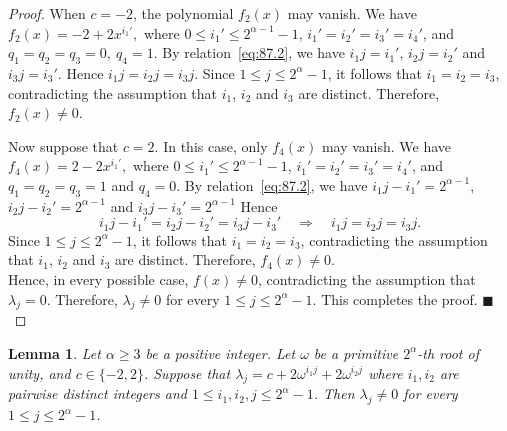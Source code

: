 \documentclass[12pt]{article}
\newtheorem{lemA}[propA]{Lemma}
\begin{document}
\begin{proof}
When $c=-2$, the polynomial $f_2(x)$ may vanish. We have
$
f_2(x)=-2+2x^{i_1'},
$
where $0\le i_1'\le 2^{\alpha-1}-1$, $i_1'=i_2'=i_3'=i_4'$, and $q_1=q_2=q_3=0,\ q_4=1$. By relation~\eqref{eq:87.2}, we have
$
i_1j=i_1'$, $i_2j=i_2'$ and $i_3j=i_3'$.
Hence $i_1j=i_2j=i_3j$.
Since $1\le j\le2^\alpha-1$, it follows that $i_1=i_2=i_3$, contradicting the assumption that $i_1$, $i_2$ and $i_3$ are distinct. Therefore, $f_2(x)\ne0$.

Now suppose that $c=2$. In this case, only $f_4(x)$ may vanish. We have
$
f_4(x)=2-2x^{i_1'},
$
where $0\le i_1'\le2^{\alpha-1}-1$, $i_1'=i_2'=i_3'=i_4'$, and $q_1=q_2=q_3=1$ and $q_4=0$. By relation~\eqref{eq:87.2}, we have
$
i_1j-i_1'=2^{\alpha-1}$,
$i_2j-i_2'=2^{\alpha-1}$ and $i_3j-i_3'=2^{\alpha-1}$
Hence
\[
i_1j-i_1'=i_2j-i_2'=i_3j-i_3'
\quad\Longrightarrow\quad
i_1j=i_2j=i_3j.
\]
Since $1\le j\le2^\alpha-1$, it follows that $i_1=i_2=i_3$, contradicting the assumption that $i_1$, $i_2$ and $i_3$ are distinct. Therefore, $f_4(x)\ne0$.\\
Hence, in every possible case, $f(x) \neq 0$, contradicting the assumption that $\lambda_j = 0$.
Therefore, $\lambda_j \neq 0$ for every $1 \leq j \leq 2^\alpha - 1$. This completes the proof.
\hfill$\blacksquare$
  \end{proof}
\begin{lemA}\label{lem:nonzero2}
	Let $\alpha \ge 3$ be a positive integer. Let $\omega$ be a primitive $2^\alpha$-th root of unity, and $c\in\{-2,2\}$. Suppose that
    $\lambda_j=c+2\omega^{i_1j}+2\omega^{i_2j}$
	where $i_1,i_2$ are pairwise distinct integers and
	$1\le i_1,i_2,j\le 2^\alpha-1$.
	Then $\lambda_j\ne0$ for every $1\le j\le 2^\alpha-1$.
\end{lemA}
\end{document}
